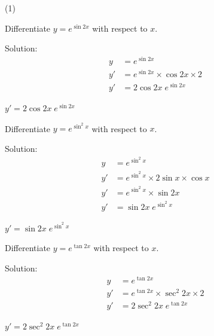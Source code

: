 \clearpage
\begin{mtask}(1)
   \task \begin{exercise} Differentiate $y=e^{\sin{2x}}$ with respect to $x$.
             \begin{envSolution}
			      Solution:
			      \begin{align*}
			           y & =e^{\sin 2x}                          \\[15pt]
                       y' & =e^{\sin 2x} \times \cos 2x \times 2 \\[10pt]
   					   y' & =2\cos 2x \; e^{\sin 2x}
				 \end{align*}
                 \begin{shortsolution}  
				       $y' =2\cos 2x \; e^{\sin 2x}$
			     \end{shortsolution}				 
               \end{envSolution}
         \end{exercise}

   \task \begin{exercise} Differentiate $y=e^{\sin^{2}x}$ with respect to $x$.
             \begin{envSolution}
			      Solution:
			      \begin{align*}
			           y & =e^{\sin ^{2} x}                               \\[15pt]
                       y' & =e^{\sin ^{2} x} \times 2\sin x \times \cos x \\[10pt]
   					   y' & =e^{\sin ^{2} x} \times \sin 2x               \\[10pt]
   					   y' & =\sin 2x \; e^{\sin ^{2} x}                  
				 \end{align*}
                 \begin{shortsolution}  
				       $y' =\sin 2x \; e^{\sin ^{2} x}$
			     \end{shortsolution}				 
               \end{envSolution}
         \end{exercise}

   \task \begin{exercise} Differentiate $y=e^{\tan 2x}$ with respect to $x$.
             \begin{envSolution}
			      Solution:
			      \begin{align*}
			           y & =e^{\tan 2x}                          \\[15pt]
                       y' & =e^{\tan 2x} \times \sec^2 2x \times 2 \\[10pt]
   					   y' & =2\sec^2 2x \; e^{\tan 2x}
				 \end{align*}
                 \begin{shortsolution}  
				       $y'  =2\sec^2 2x \; e^{\tan 2x}$
			     \end{shortsolution}				 
               \end{envSolution}
         \end{exercise}


\end{mtask}
